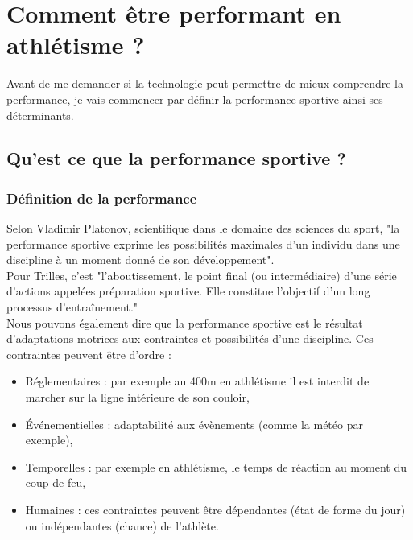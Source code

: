 \chapter{Comment être performant en athlétisme ?}
\label{part:performance}

Avant de me demander si la technologie peut permettre de mieux comprendre la performance, je vais commencer par définir la performance sportive ainsi ses déterminants.

    \section {Qu'est ce que la performance sportive ?}

        \subsection{Définition de la performance}
        
            Selon Vladimir Platonov, scientifique dans le domaine des sciences du sport, "la performance sportive exprime les possibilités maximales d'un individu dans une discipline à un moment donné de son développement". \\
            
            Pour Trilles, c'est "l'aboutissement, le point final (ou intermédiaire) d'une série d'actions appelées préparation sportive. Elle constitue l'objectif d'un long processus d'entraînement."\\
        
            Nous pouvons également dire que la performance sportive est le résultat d’adaptations motrices aux contraintes et possibilités d'une discipline. 
            Ces contraintes peuvent être d'ordre :
            \begin{itemize}
                \item Réglementaires : par exemple au 400m en athlétisme il est interdit de marcher sur la ligne intérieure de son couloir,
                \item Événementielles : adaptabilité aux évènements (comme la météo par exemple),
                \item Temporelles : par exemple en athlétisme, le temps de réaction au moment du coup de feu,
                \item Humaines : ces contraintes peuvent être dépendantes (état de forme du jour) ou indépendantes (chance) de l'athlète.\\
            \end{itemize}
        
